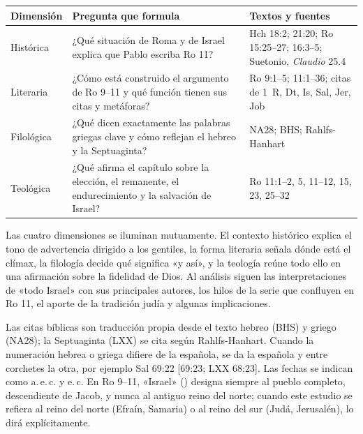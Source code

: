\begin{center}\small
\renewcommand{\arraystretch}{1.3}
\begin{tabular}{>{\RaggedRight\arraybackslash}p{2.4cm}>{\RaggedRight\arraybackslash}p{6.4cm}>{\RaggedRight\arraybackslash}p{5.2cm}}
\toprule
\textbf{Dimensión} & \textbf{Pregunta que formula} & \textbf{Textos y fuentes}\\
\midrule
Histórica & ¿Qué situación de Roma y de Israel explica que Pablo escriba Ro 11? & Hch 18:2; 21:20; Ro 15:25--27; 16:3--5; Suetonio, \emph{Claudio} 25.4\\
Literaria & ¿Cómo está construido el argumento de Ro 9--11 y qué función tienen sus citas y metáforas? & Ro 9:1--5; 11:1--36; citas de 1~R, Dt, Is, Sal, Jer, Job\\
Filológica & ¿Qué dicen exactamente las palabras griegas clave y cómo reflejan el hebreo y la Septuaginta? & NA28; BHS; Rahlfs-Hanhart\\
Teológica & ¿Qué afirma el capítulo sobre la elección, el remanente, el endurecimiento y la salvación de Israel? & Ro 11:1--2, 5, 11--12, 15, 23, 25--32\\
\bottomrule
\end{tabular}\end{center}

Las cuatro dimensiones se iluminan mutuamente. El contexto histórico explica el tono de advertencia dirigido a los gentiles, la forma literaria señala dónde está el clímax, la filología decide qué significa «y así», y la teología reúne todo ello en una afirmación sobre la fidelidad de Dios. Al análisis siguen las interpretaciones de «todo Israel» con sus principales autores, los hilos de la serie que confluyen en Ro 11, el aporte de la tradición judía y algunas implicaciones.

\begin{nota}
Las citas bíblicas son traducción propia desde el texto hebreo (BHS) y griego (NA28); la Septuaginta (LXX) se cita según Rahlfs-Hanhart. Cuando la numeración hebrea o griega difiere de la española, se da la española y entre corchetes la otra, por ejemplo Sal 69:22 [69:23; LXX 68:23]. Las fechas se indican como a.\,e.\,c. y e.\,c. En Ro 9--11, «Israel» () designa siempre al pueblo completo, descendiente de Jacob, y nunca al antiguo reino del norte; cuando este estudio se refiera al reino del norte (Efraín, Samaria) o al reino del sur (Judá, Jerusalén), lo dirá explícitamente.
\end{nota}

